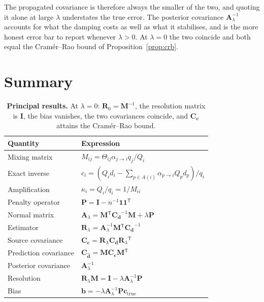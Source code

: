 \documentclass[11pt]{article}
\newcommand{\cvec}{\ensuremath{\mathbf{c}}\xspace}
\newcommand{\Mmat}{\ensuremath{\mathbf{M}}\xspace}
\newcommand{\Rmat}{\ensuremath{\mathbf{R}}\xspace}
\newcommand{\Pmat}{\ensuremath{\mathbf{P}}\xspace}
\newcommand{\Amat}{\ensuremath{\mathbf{A}}\xspace}
\newcommand{\Imat}{\ensuremath{\mathbf{I}}\xspace}
\newcommand{\onevec}{\ensuremath{\mathbf{1}}\xspace}
\newcommand{\Cd}{\ensuremath{\mathbf{C}_{\mathbf{d}}}\xspace}
\newcommand{\Cc}{\ensuremath{\mathbf{C}_{\mathbf{c}}}\xspace}
\newcommand{\Cdhat}{\ensuremath{\mathbf{C}_{\hat{\mathbf{d}}}}\xspace}
\newcommand{\transpose}{\ensuremath{^{\mathsf{T}}}}
\theoremstyle{definition}
\begin{document}
\noindent The propagated covariance is therefore always the smaller of the two, and quoting it
alone at large $\lambda$ understates the true error. The posterior covariance
$\Amat_\lambda^{-1}$ accounts for what the damping costs as well as what it stabilises, and is
the more honest error bar to report whenever $\lambda > 0$. At $\lambda = 0$ the two coincide
and both equal the Cram\'er--Rao bound of Proposition~\ref{prop:crb}.

\section{Summary}

\begin{table}[h]
\centering
\small
\begin{tabular}{@{}ll@{}}
\toprule
Quantity & Expression \\
\midrule
Mixing matrix & $M_{ij} = \Theta_{ij}\alpha_{j\to i} q_j / Q_i$ \\
Exact inverse & $c_i = \left(Q_i d_i - \sum_{p \in A(i)}\alpha_{p\to i}Q_p d_p\right)/q_i$ \\
Amplification & $\kappa_i = Q_i/q_i = 1/M_{ii}$ \\
Penalty operator & $\Pmat = \Imat - n^{-1}\onevec\onevec\transpose$ \\
Normal matrix & $\Amat_\lambda = \Mmat\transpose\Cd^{-1}\Mmat + \lambda\Pmat$ \\
Estimator & $\Rmat_\lambda = \Amat_\lambda^{-1}\Mmat\transpose\Cd^{-1}$ \\
Source covariance & $\Cc = \Rmat_\lambda\Cd\Rmat_\lambda\transpose$ \\
Prediction covariance & $\Cdhat = \Mmat\Cc\Mmat\transpose$ \\
Posterior covariance & $\Amat_\lambda^{-1}$ \\
Resolution & $\Rmat_\lambda\Mmat = \Imat - \lambda\Amat_\lambda^{-1}\Pmat$ \\
Bias & $\mathbf{b} = -\lambda\Amat_\lambda^{-1}\Pmat\cvec_{\text{true}}$ \\
\bottomrule
\end{tabular}
\caption{\textbf{Principal results.} At $\lambda = 0$: $\Rmat_0 = \Mmat^{-1}$, the resolution
matrix is $\Imat$, the bias vanishes, the two covariances coincide, and $\Cc$ attains the
Cram\'er--Rao bound.}
\end{table}
\end{document}
